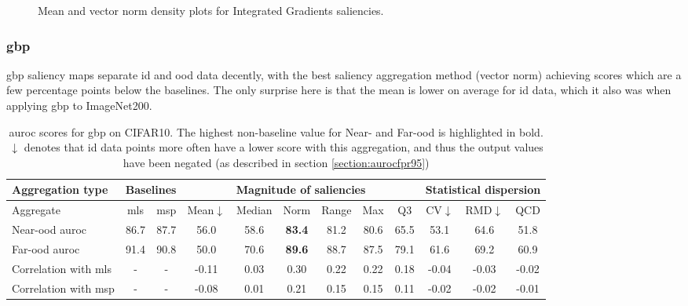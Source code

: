 \documentclass[UKenglish]{uiomasterthesis} %
\theoremstyle{definition}
\begin{document}
\begin{figure}[H]
    \begin{center}
        
    \end{center}
    \caption[CIFAR10 mean and norm density plots for Integrated Gradients]{Mean and vector norm density plots for Integrated Gradients saliencies.}
    \label{fig:cifar10_integratedgradients_mean_norm}
\end{figure}

\subsubsection{\ac*{gbp}}

\ac{gbp} saliency maps separate \ac{id} and \ac{ood} data decently, with the best saliency aggregation method (vector norm) achieving scores which are a few percentage points below the baselines. The only surprise here is that the mean is lower on average for \ac{id} data, which it also was when applying \ac{gbp} to ImageNet200.

\begin{table}[H]
\setlength\tabcolsep{3pt}
\begin{center}
\begin{tabular}{ |p{5.1em}|c c|c c c c c c|c c c| }
    \hline
     \centering Aggregation type & \multicolumn{2}{c|}{Baselines} & \multicolumn{6}{c|}{Magnitude of saliencies} & \multicolumn{3}{p{8em}|}{\centering Statistical dispersion} \\
    \hline
    Aggregate & \ac{mls} & \ac{msp} & Mean$\downarrow$ & Median & Norm & Range & Max & Q3 & CV$\downarrow$ & RMD$\downarrow$ & QCD  \\
    \hline
    \rowcolor{near!50}
    Near-\ac{ood} \ac{auroc} & 86.7 & 87.7 & 56.0 & 58.6 &\textbf{ 83.4 }& 81.2 & 80.6 & 65.5 & 53.1 & 64.6 & 51.8  \\
    \hline
    \rowcolor{far!50}
    Far-\ac{ood} \ac{auroc} & 91.4 & 90.8 & 50.0 & 70.6 &\textbf{ 89.6 }& 88.7 & 87.5 & 79.1 & 61.6 & 69.2 & 60.9  \\
    \hline
    Correlation with \ac{mls}& - & - & -0.11 & 0.03 & 0.30 & 0.22 & 0.22 & 0.18 & -0.04 & -0.03 & -0.02  \\
    \hline
    Correlation with \ac{msp}& - & - & -0.08 & 0.01 & 0.21 & 0.15 & 0.15 & 0.11 & -0.02 & -0.02 & -0.01  \\
    \hline
    \end{tabular}
    \caption[\ac{auroc} scores for \ac{gbp} on CIFAR10]{\ac{auroc} scores for \ac{gbp} on CIFAR10. The highest non-baseline value for Near- and Far-\ac{ood} is highlighted in bold. $\downarrow$ denotes that \ac{id} data points more often have a lower score with this aggregation, and thus the output values have been negated (as described in section \ref{section:aurocfpr95})}
    \label{table:cifar10_gbp_metrics}
\end{center}
\setlength\tabcolsep{6pt}
\end{table}
\end{document}
